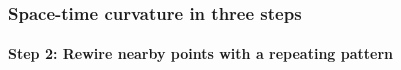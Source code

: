 \documentclass[compress]{beamer}
\begin{document}
\begin{frame}
\frametitle{Space-time curvature in three steps}
\framesubtitle{Step 2: Rewire nearby points with a repeating pattern}

\begin{center}
\end{center}
\end{frame}
\end{document}
